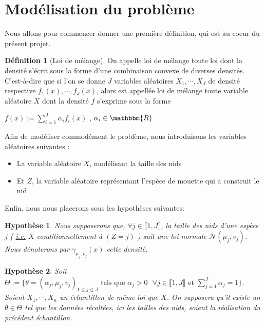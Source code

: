 \documentclass[frenchb]{report}
\newcommand{\R}{\mathbbm{R}}
\newcommand{\1}{\mathbbm{1}}
\newcommand{\n}{\mathcal{N}}
\newtheorem{hyp}{Hypothèse}
\theoremstyle{definition}\newtheorem{defn}{Définition}
\theoremstyle{definition}\newtheorem{exm}{Exemple}
\theoremstyle{definition}\newtheorem{nota}{Notation}
\theoremstyle{definition}\newtheorem{rem}{Remarque}
\begin{document}
\section{Modélisation du problème}

Nous allons pour commencer donner une première définition, qui est au coeur du présent projet.

\begin{defn}[Loi de mélange]
On appelle loi de mélange toute loi dont la densité s'écrit sous la forme d'une combinaison convexe de diverses densités. C'est-à-dire que si l'on se donne $J$ variables aléatoires $X_1, \cdots, X_J$ de densité respective $f_1(x), \cdots, f_J(x)$, alors est appellée loi de mélange toute variable aléatoire $X$ dont la densité $f$ s'exprime sous la forme
\begin{center} $f(x) := \displaystyle\sum_{i=1}^J \alpha_i f_i(x)$ , $\alpha_i \in\R$ \end{center}

\end{defn}

Afin de modéliser commodément le problème, nous introduisons les variables aléatoires suivantes :

\begin{itemize}[label=\adfflowerleft]
	\item La variable aléatoire $X$, modélisant la taille des nids
	\item Et $Z$, la variable aléatoire représentant l'espèce de mouette qui a construit le nid
\end{itemize}

Enfin, nous nous placerons sous les hypothèses suivantes:

\begin{hyp}
Nous supposerons que, $\forall j\in \llbracket 1,J \rrbracket$, la taille des nids d'une espèce $j$ ( \underline{i.e.} $X$ conditionnellement à $(Z=j)$ ) suit une loi normale $\n(\mu_j,v_j)$. Nous dénoterons par $\gamma_{\mu_j, v_j}(x)$ cette densité.
\end{hyp}


\begin{hyp}
Soit $\Theta := \{ \theta = (\alpha_j,\mu_j, v_j)_{1 \leq j \leq J} \text{ tels que } \alpha_j > 0 \text{ } \forall j\in \llbracket 1,J\rrbracket \text{ et } \displaystyle\sum_{j=1}^J\alpha_j=1\}$. Soient $X_1, \cdots, X_n$ un échantillon de même loi que $X$. On supposera qu'il existe un $\theta \in \Theta$ tel que les données récoltées, ici les tailles des nids, soient la réalisation du précédent échantillon.
\end{hyp}
\end{document}
